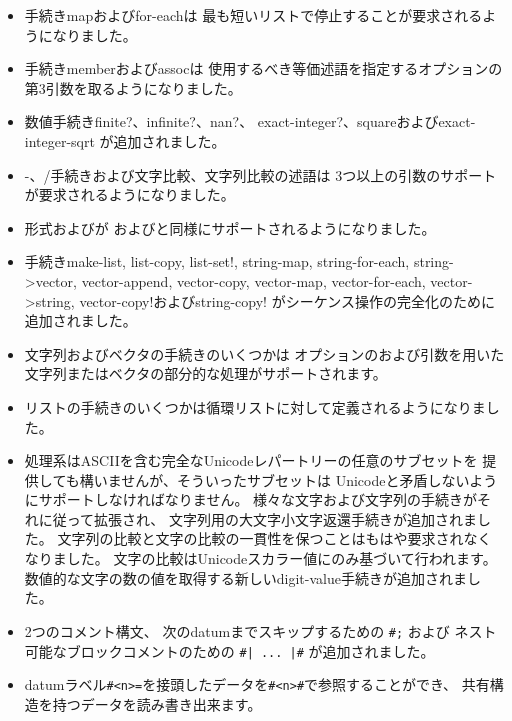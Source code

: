 \begin{itemize}
\item 手続き{\cf map}および{\cf for-each}は
最も短いリストで停止することが要求されるようになりました。

\item 手続き{\cf member}および{\cf assoc}は
使用するべき等価述語を指定するオプションの第3引数を取るようになりました。

\item 数値手続き{\cf finite?}、{\cf infinite?}、{\cf nan?}、
{\cf exact-integer?}、{\cf square}および{\cf exact-integer-sqrt}
が追加されました。

\item {\cf -}、{\cf /}手続きおよび文字比較、文字列比較の述語は
3つ以上の引数のサポートが要求されるようになりました。

\item 形式\sharptrue{}および\sharpfalse{}が
\schtrue{}および\schfalse{}と同様にサポートされるようになりました。

\item 手続き{\cf make-list}, {\cf list-copy}, {\cf list-set!},
{\cf string-map}, {\cf string-for-each}, {\cf string->vector}, 
{\cf vector-append},
{\cf vector-copy}, {\cf vector-map}, {\cf vector-for-each}, 
{\cf vector->string}, {\cf vector-copy!}および{\cf string-copy!}
がシーケンス操作の完全化のために追加されました。

\item 文字列およびベクタの手続きのいくつかは
オプションのおよび引数を用いた
文字列またはベクタの部分的な処理がサポートされます。

\item リストの手続きのいくつかは循環リストに対して定義されるようになりました。

\item 処理系はASCIIを含む完全なUnicodeレパートリーの任意のサブセットを
提供しても構いませんが、そういったサブセットは
Unicodeと矛盾しないようにサポートしなければなりません。
様々な文字および文字列の手続きがそれに従って拡張され、
文字列用の大文字小文字返還手続きが追加されました。
文字列の比較と文字の比較の一貫性を保つことはもはや要求されなくなりました。
文字の比較はUnicodeスカラー値にのみ基づいて行われます。
数値的な文字の数の値を取得する新しい{\cf digit-value}手続きが追加されました。

\item 2つのコメント構文、
次のdatumまでスキップするための {\tt \#;} および
ネスト可能なブロックコメントのための {\tt \#| ... |\#}
が追加されました。

\item datumラベル{\tt \#<n>=}を接頭したデータを{\tt \#<n>\#}で参照することができ、
共有構造を持つデータを読み書き出来ます。


\end{itemize}

